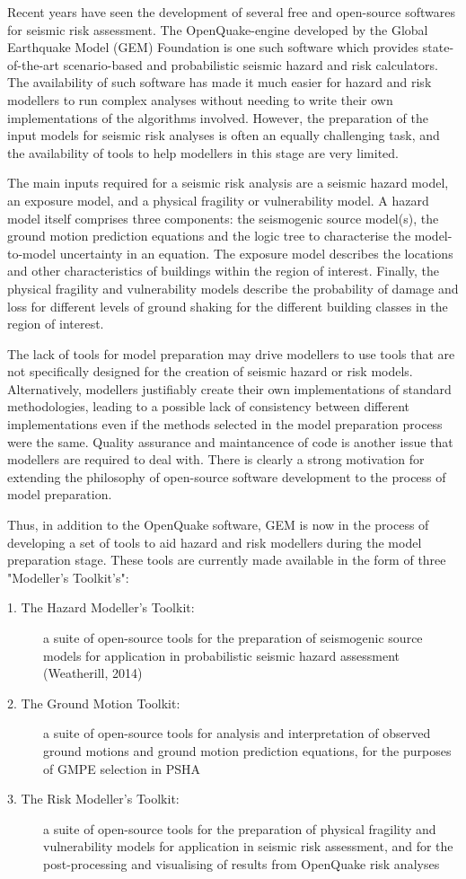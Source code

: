 Recent years have seen the development of several free and open-source softwares for seismic risk assessment. The OpenQuake-engine developed by the Global Earthquake Model (GEM) Foundation is one such software which provides state-of-the-art scenario-based and probabilistic seismic hazard and risk calculators. The availability of such software has made it much easier for hazard and risk modellers to run complex analyses without needing to write their own implementations of the algorithms involved. However, the preparation of the input models for seismic risk analyses is often an equally challenging task, and the availability of tools to help modellers in this stage are very limited.

The main inputs required for a seismic risk analysis are a seismic hazard model, an exposure model, and a physical fragility or vulnerability model. A hazard model itself comprises three components: the seismogenic source model(s), the ground motion prediction equations and the logic tree to characterise the model-to-model uncertainty in an equation. The exposure model describes the locations and other characteristics of buildings within the region of interest. Finally, the physical fragility and vulnerability models describe the probability of damage and loss for different levels of ground shaking for the different building classes in the region of interest.

The lack of tools for model preparation may drive modellers to use tools that are not specifically designed for the creation of seismic hazard or risk models. Alternatively, modellers justifiably create their own implementations of standard methodologies, leading to a possible lack of consistency between different implementations even if the methods selected in the model preparation process were the same. Quality assurance and maintancence of code is another issue that modellers are required to deal with. There is clearly a strong motivation for extending the philosophy of open-source software development to the process of model preparation.

Thus, in addition to the OpenQuake software, GEM is now in the process of developing a set of tools to aid hazard and risk modellers during the model preparation stage. These tools are currently made available in the form of three "Modeller’s Toolkit’s":
\begin{description}
\item[1. The Hazard Modeller’s Toolkit:] a suite of open-source tools for the preparation of seismogenic source models for application in probabilistic seismic hazard assessment (Weatherill, 2014)
\item[2. The Ground Motion Toolkit:] a suite of open-source tools for analysis and interpretation of observed ground motions and ground motion prediction equations, for the purposes of GMPE selection in PSHA
\item[3. The Risk Modeller's Toolkit:] a suite of open-source tools for the preparation of physical fragility and vulnerability models for application in seismic risk assessment, and for the post-processing and visualising of results from OpenQuake risk analyses
\end{description}

